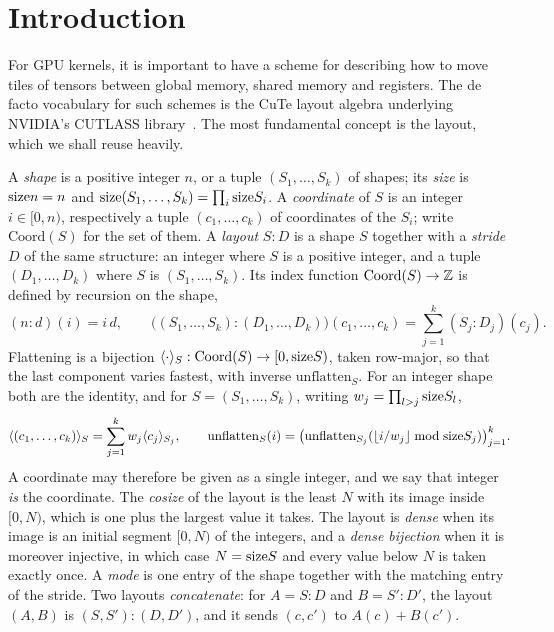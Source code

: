 \section{Introduction}\label{sec:intro}

For GPU kernels, it is important to have a scheme for describing how to move
tiles of tensors between global memory, shared memory and registers. The de
facto vocabulary for such schemes is the CuTe layout algebra underlying
NVIDIA's CUTLASS library~\cite{cutedocs,cecka}. The most fundamental concept
is the layout, which we shall reuse heavily.

\begin{definition}[Layout]\label{def:layout}
A \emph{shape} is a positive integer $n$, or a tuple $(S_1,\dots,S_k)$ of
shapes; its \emph{size} is $\mathrm{size} n = n$ and
$\mathrm{size} (S_1,\dots,S_k) = \prod_i \mathrm{size} S_i$. A \emph{coordinate} of $S$ is
an integer $i \in [0,n)$, respectively a tuple $(c_1,\dots,c_k)$ of
coordinates of the $S_i$; write $\mathrm{Coord}(S)$ for the set of them. A
\emph{layout} $S{:}D$ is a shape $S$ together with a \emph{stride} $D$ of the
same structure: an integer where $S$ is a positive integer, and a tuple
$(D_1,\dots,D_k)$ where $S$ is $(S_1,\dots,S_k)$. Its index function
$\mathrm{Coord}(S) \to \mathbb{Z}$ is defined by recursion on the shape,
\[
(n{:}d)(i) = i\,d,
\qquad
\big((S_1,\dots,S_k){:}(D_1,\dots,D_k)\big)(c_1,\dots,c_k)
= \sum_{j=1}^{k} (S_j{:}D_j)(c_j).
\] Flattening is a bijection $\langle \cdot \rangle_{S} : \mathrm{Coord}(S) \to
[0,\mathrm{size} S)$, taken row-major, so that the last component varies fastest, with
inverse $\mathrm{unflatten}_S$. For an integer shape both are the identity,
and for $S = (S_1,\dots,S_k)$, writing $w_j = \prod_{l>j} \mathrm{size} S_l$,
\[
\langle (c_1,\dots,c_k) \rangle_{S} = \sum_{j=1}^{k} w_j \langle c_j \rangle_{S_j},
\qquad
\mathrm{unflatten}_S(i) = \big(\mathrm{unflatten}_{S_j}(\lfloor i/w_j \rfloor
\bmod \mathrm{size} S_j)\big)_{j=1}^{k}.
\]
A coordinate may therefore be given as a single
integer, and we say that integer \emph{is} the coordinate. The \emph{cosize} of the layout is the least $N$ with its
image inside $[0,N)$, which is one plus the largest value it takes. The layout
is \emph{dense} when its image is an initial segment $[0,N)$ of the integers,
and a \emph{dense bijection} when it is moreover injective, in which case
$N = \mathrm{size} S$ and every value below $N$ is taken exactly once. A
\emph{mode} is one entry of the shape together with the matching entry of the
stride. Two layouts \emph{concatenate}: for $A = S{:}D$ and $B = S'{:}D'$, the
layout $(A,B)$ is $(S,S'){:}(D,D')$, and it sends $(c,c')$ to $A(c) + B(c')$.
\end{definition}

